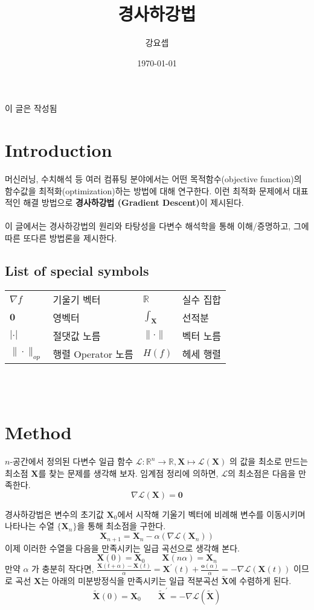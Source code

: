 \documentclass[a4paper,20pt]{article}
\theoremstyle{definition}
\newcommand{\curve}[1][X]{\tilde{\mathbf{#1}}}
\begin{document}
\title{\LARGE{경사하강법}}
\author{강요셉}
\date{\today}
\maketitle
{}
\* 이 글은  작성됨

\newpage

\tableofcontents
\newpage
{}
\section{Introduction}
머신러닝, 수치해석 등 여러 컴퓨팅 분야에서는 어떤 목적함수(objective function)의 함수값을
최적화(optimization)하는 방법에 대해 연구한다. 이런 최적화 문제에서 대표적인 해결 방법으로 \textbf{경사하강법 (Gradient Descent)}이 제시된다. 
\\\\
이 글에서는 경사하강법의 원리와 타탕성을 다변수 해석학을 통해 이해/증명하고, 그에 따른 또다른 방법론을 제시한다.

	\subsection{List of special symbols}
	\begin{tabular}{llll}
	$\nabla f$ & 기울기 벡터 & $\mathbb{R}$ & 실수 집합 \\ 
	$\mathbf{0}$ & 영벡터 & $\int_{\mathbf{X}}$ & 선적분 \\
	$|\cdot |$ & 절댓값 노름 & $\| \cdot \|$ & 벡터 노름 \\
	$\| \cdot \|_{op}$ & 행렬 Operator 노름 & $H(f)$ & 헤세 행렬 \\
	\end{tabular}
\\\\
\section{Method}

$n$-공간에서 정의된 다변수 일급 함수 $\mathcal{L}:\mathbb{R}^{n}\rightarrow\mathbb{R}, \mathbf{X}\mapsto\mathcal{L}(\mathbf{X})$
의 값을 최소로 만드는 최소점 $\mathbf{X}$를 찾는 문제를 생각해 보자. 임계점 정리에 의하면, $\mathcal{L}$의 최소점은 다음을 만족한다.
$$\nabla\mathcal{L}(\mathbf{X})=\mathbf{0}$$ 

경사하강법은 변수의 초기값 $\mathbf{X}_{0}$에서 시작해 기울기 벡터에 비례해 변수를 이동시키며 나타나는 수열 $\{ \mathbf{X}_{n}\}$을 통해 최소점을 구한다. 
$$\mathbf{X}_{n+1}=\mathbf{X}_{n}-\alpha(\nabla\mathcal{L}(\mathbf{X}_{n}))$$
이제 이러한 수열을 다음을 만족시키는 일급 곡선으로 생각해 본다.
$$\mathbf{X}(0)=\mathbf{X}_{0} \qquad \mathbf{X}(n\alpha)=\mathbf{X}_{n}$$
만약 $\alpha$ 가 충분히 작다면, $\frac{\mathbf{X}(t+\alpha)-\mathbf{X}(t)}{\alpha} = \mathbf{X}^{\prime}(t)+ \frac{\mathbf{o}(\alpha)}{\alpha}=-\nabla\mathcal{L}(\mathbf{X}(t))$ 이므로
곡선 $\mathbf{X}$는 아래의 미분방정식을 만족시키는 일급 적분곡선 
$\curve$에 수렴하게 된다.
$$ \curve(0)=\mathbf{X}_{0} \qquad \curve^{\prime}=-\nabla\mathcal{L}(\curve) $$
\end{document}
